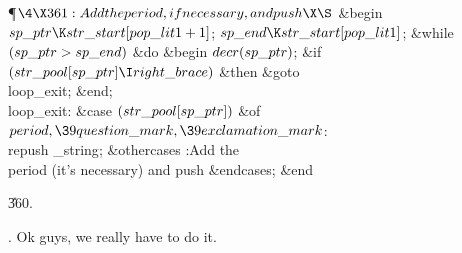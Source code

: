 \Y\P$\4\X361:Add the \\{period}, if necessary, and push\X\S$\6
\&{begin} $\\{sp\_ptr}\K\\{str\_start}[\\{pop\_lit1}+1]$;\5
$\\{sp\_end}\K\\{str\_start}[\\{pop\_lit1}]$;\6
\&{while} $(\\{sp\_ptr}>\\{sp\_end})$ \1\&{do}\6
\&{begin} $\\{decr}(\\{sp\_ptr})$;\6
\&{if} $(\\{str\_pool}[\\{sp\_ptr}]\I\\{right\_brace})$ \1\&{then}\5
\&{goto} \\{loop\_exit};\2\6
\&{end};\2\6
\4\\{loop\_exit}: \&{case} $(\\{str\_pool}[\\{sp\_ptr}])$ \1\&{of}\6
\4$\\{period},\39\\{question\_mark},\39\\{exclamation\_mark}$: \\{repush%
\_string};\6
\4\&{othercases} :Add the \\{period} (it's necessary) and push\X\2\6
\&{endcases};\6
\&{end}\par
\U360.\fi

.
Ok guys, we really have to do it.

